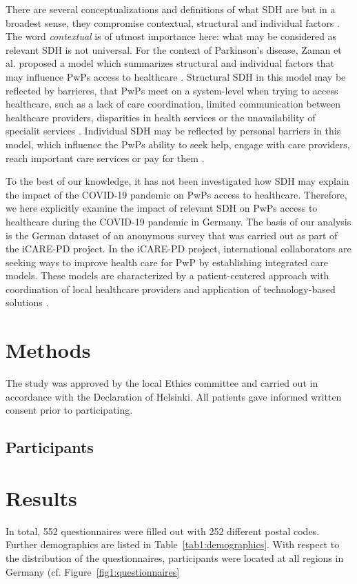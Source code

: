 \documentclass{bmcart}
\begin{document}
	There are several conceptualizations and definitions of what SDH are but in a broadest sense, they compromise contextual, structural and individual factors \cite{world2010conceptual}. The word \textit{contextual} is of utmost importance here: what may be considered as relevant SDH is not universal. For the context of Parkinson's disease, Zaman  et al. proposed a model which summarizes structural and individual factors that may influence PwPs access to healthcare \cite{zaman2021barriers}. 
	Structural SDH in this model may be reflected by barrieres, that PwPs meet on a system-level when trying to access healthcare, such as a lack of care coordination, limited communication between healthcare providers, disparities in health services or the unavailability of specialit services \cite{zaman2021barriers}. Individual SDH may be reflected by personal barriers in this model, which influence the PwPs ability to seek help, engage with care providers, reach important care services or pay for them \cite{zaman2021barriers}. 
	
	To the best of our knowledge, it has not been investigated how SDH may explain the impact of the COVID-19 pandemic on PwPs access to healthcare. Therefore, we here explicitly examine the impact of relevant SDH on PwPs access to healthcare during the COVID-19 pandemic in Germany. The basis of our analysis is the German dataset of an anonymous survey that was carried out as part of the iCARE-PD project. In the iCARE-PD project, international collaborators are seeking ways to improve health care for PwP by establishing integrated care models. These models are characterized by a patient-centered approach with coordination of local healthcare providers and application of technology-based solutions \cite{fabbri2020moving}.  
	
\section*{Methods}
The study was approved by the local Ethics committee and carried out in accordance with the Declaration of Helsinki. All patients gave informed written consent prior to participating.

\subsection*{Participants}


\section*{Results}
In total, 552 questionnaires were filled out with 252 different postal codes. Further demographics are listed in Table~\ref{tab1:demographics}. With respect to the distribution of the questionnaires, participants were located at all regions in Germany (cf. Figure~\ref{fig1:questionnaires}
\end{document}
